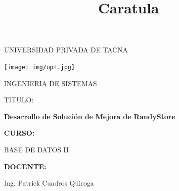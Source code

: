 \documentclass[12pt,letterpaper]{article}
\begin{document}
%


\title{Caratula}

\begin{titlepage}
\begin{center}
\large{UNIVERSIDAD PRIVADA DE TACNA}\\
\vspace*{-0.025in}
\begin{figure}[htb]
\begin{center}

\end{center}
\end{figure}
\begin{center}
    \texttt{[image: img/upt.jpg]}  
\end{center}

\vspace*{0.15in}
INGENIERIA DE SISTEMAS  \\

\vspace*{0.5in}
\begin{large}
TITULO:\\
\end{large}

\vspace*{0.1in}
\begin{Large}
\textbf{Desarrollo de Solución de Mejora de RandyStore} \\
\end{Large}

\vspace*{0.3in}
\begin{Large}
\textbf{CURSO:} \\
\end{Large}

\vspace*{0.1in}
\begin{large}
BASE DE DATOS II\\
\end{large}

\vspace*{0.3in}
\begin{Large}
\textbf{DOCENTE:} \\
\end{Large}

\vspace*{0.1in}
\begin{large}
Ing. Patrick Cuadros Quiroga\\
\end{large}


\end{center}
\end{titlepage}
\end{document}
